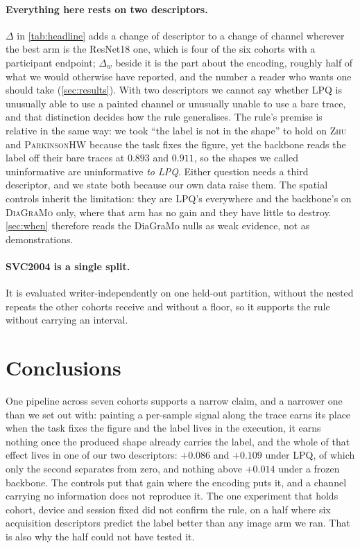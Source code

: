 \documentclass[10pt,a4paper]{article}
\begin{document}
\paragraph{Everything here rests on two descriptors.} $\Delta$ in \cref{tab:headline} adds a change
of descriptor to a change of channel wherever the best arm is the ResNet18 one, which is four of the
six cohorts with a participant endpoint; $\Delta_w$ beside it is the part about the encoding,
roughly half of what we would otherwise have reported, and the number a reader who wants one should
take (\cref{sec:results}). With two descriptors we cannot say whether LPQ is unusually able to use a
painted channel or unusually unable to use a bare trace, and that distinction decides how the rule
generalises. The rule's premise is relative in the same way: we took ``the label is not in the
shape'' to hold on \textsc{Zhu} and \textsc{ParkinsonHW} because the task fixes the figure, yet the
backbone reads the label off their bare traces at $0.893$ and $0.911$, so the shapes we called
uninformative are uninformative \emph{to LPQ}. Either question needs a third descriptor, and we
state both because our own data raise them. The spatial controls inherit the limitation: they are
LPQ's everywhere and the backbone's on \textsc{DiaGraMo} only, where that arm has no gain and they
have little to destroy. \cref{sec:when} therefore reads the DiaGraMo nulls as weak evidence,
not as demonstrations.

\paragraph{SVC2004 is a single split.} It is evaluated writer-independently on one held-out
partition, without the nested repeats the other cohorts receive and without a floor, so it supports
the rule without carrying an interval.

\section{Conclusions}
\label{sec:conclusion}


One pipeline across seven cohorts supports a narrow claim, and a narrower one than we set out with:
painting a per-sample signal along the trace earns its place when the task fixes the figure and the
label lives in the execution, it earns nothing once the produced shape already carries the label,
and the whole of that effect lives in one of our two descriptors: $+0.086$ and $+0.109$ under
LPQ, of which only the second separates from zero, and nothing above $+0.014$ under a frozen
backbone. The controls put that gain where the encoding puts it, and a channel carrying no
information does not reproduce it. The one experiment that holds cohort, device and session fixed
did not confirm the rule, on a half where six acquisition descriptors predict the label better than
any image arm we ran. That is also why the half could not have tested it.
\end{document}
